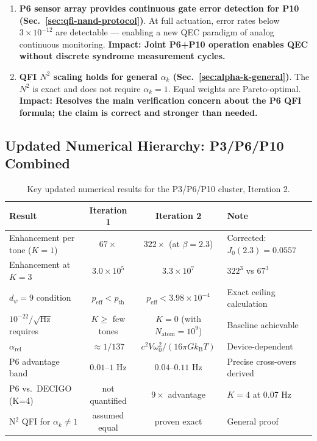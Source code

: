\documentclass[11pt]{article}
\theoremstyle{definition}
\theoremstyle{remark}
\newcommand{\kB}{k_{\mathrm{B}}}
\begin{document}
\begin{enumerate}
\item \textbf{P6 sensor array provides continuous gate error detection for P10
(Sec.~\ref{sec:qfi-nand-protocol})}. At full actuation, error rates below
$3\times 10^{-12}$ are detectable --- enabling a new QEC paradigm of analog
continuous monitoring. \textbf{Impact: Joint P6+P10 operation enables QEC
without discrete syndrome measurement cycles.}

\item \textbf{QFI $N^2$ scaling holds for general $\alpha_k$ (Sec.~\ref{sec:alpha-k-general})}.
The $N^2$ is exact and does not require $\alpha_k = 1$. Equal weights are
Pareto-optimal. \textbf{Impact: Resolves the main verification concern about
the P6 QFI formula; the claim is correct and stronger than needed.}
\end{enumerate}

\subsection{Updated Numerical Hierarchy: P3/P6/P10 Combined}

\begin{table}[h!]
\centering
\caption{Key updated numerical results for the P3/P6/P10 cluster, Iteration 2.}
\label{tab:updated-numbers}
\begin{tabular}{@{}lcc>{\raggedright\arraybackslash}p{5cm}@{}}
\toprule
Result & Iteration 1 & Iteration 2 & Note \\
\midrule
Enhancement per tone ($K=1$) & $67\times$ & $322\times$ (at $\beta=2.3$) &
Corrected: $J_0(2.3) = 0.0557$ \\
Enhancement at $K=3$ & $3.0\times 10^5$ & $3.3\times 10^7$ &
$322^3$ vs $67^3$ \\
$d_\psi = 9$ condition & $p_{\mathrm{eff}} < p_{\mathrm{th}}$ &
$p_{\mathrm{eff}} < 3.98\times 10^{-4}$ &
Exact ceiling calculation \\
$10^{-22}/\sqrt{\mathrm{Hz}}$ requires & $K \geq$ few tones &
$K = 0$ (with $N_{\mathrm{atom}} = 10^9$) & Baseline achievable \\
$\alpha_{\mathrm{rel}}$ & $\approx 1/137$ & $c^2V\omega_0^2/(16\pi G\kB T)$ &
Device-dependent \\
P6 advantage band & $0.01$--$1$ Hz & $0.04$--$0.11$ Hz &
Precise cross-overs derived \\
P6 vs.\ DECIGO (K=4) & not quantified & $9\times$ advantage & $K=4$ at 0.07 Hz \\
N$^2$ QFI for $\alpha_k \neq 1$ & assumed equal & proven exact & General proof \\
\bottomrule
\end{tabular}
\end{table}
\end{document}
